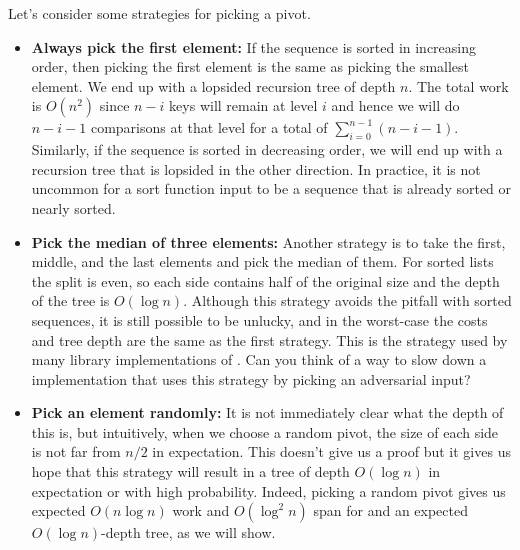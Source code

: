 {Let's consider some strategies for picking a pivot.   
\begin{itemize}
\item \textbf{Always pick the first element:} If the sequence is sorted
  in increasing order, then picking the first element is the same as
  picking the smallest element.  We end up with a lopsided recursion
  tree of depth $n$.  The total work is $O(n^2)$ since $n-i$ keys will
  remain at level $i$ and hence we will do $n-i-1$ comparisons at that
  level for a total of $\sum_{i=0}^{n-1} (n-i-1)$.  Similarly, if the
  sequence is sorted in decreasing order, we will end up with a
  recursion tree that is lopsided in the other direction.  In
  practice, it is not uncommon for a sort function input to be a
  sequence that is already sorted or nearly sorted.

\item \textbf{Pick the median of three elements:} Another strategy is to
  take the first, middle, and the last elements and pick the median of
  them.  For sorted lists the split is even, so each side contains
  half of the original size and the depth of the tree is $O(\log n)$.
  Although this strategy avoids the pitfall with sorted sequences, it
  is still possible to be unlucky, and in the worst-case the costs and
  tree depth are the same as the first strategy.  This is the strategy
  used by many library implementations of \qsort{}.  Can you think of
  a way to slow down a \qsort{} implementation that uses this
  strategy by picking an adversarial input?

\item \textbf{Pick an element randomly:} It is not immediately clear
  what the depth of this is, but intuitively, when we choose a random
  pivot, the size of each side is not far from $n/2$ in expectation.
  This doesn't give us a proof but it gives us hope that this strategy
  will result in a tree of depth $O(\log n)$ in expectation or with
  high probability.  Indeed, picking a random pivot gives us expected
  $O(n \log n)$ work and $O(\log^2 n)$ span for \qsort{} and an
  expected $O(\log n)$-depth tree, as we will show.
\end{itemize}



}
